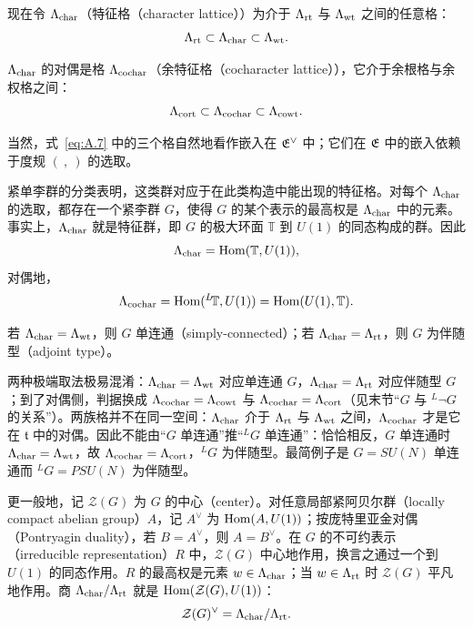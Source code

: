 现在令 $\Lambda_{\rm char}$（特征格（character lattice））为介于 $\Lambda_{\rm rt}$ 与 $\Lambda_{\rm wt}$ 之间的任意格：
\setcounter{equation}{5}
\begin{equation}\label{eq:A.6}
  \Lambda_{\rm rt}\subset \Lambda_{\rm char}\subset\Lambda_{\rm wt}.
\end{equation}

$\Lambda_{\rm char}$ 的对偶是格 $\Lambda_{\rm cochar}$（余特征格（cocharacter lattice）），它介于余根格与余权格之间：
\setcounter{equation}{6}
\begin{equation}\label{eq:A.7}
  \Lambda_{\rm cort}\subset \Lambda_{\rm cochar}\subset\Lambda_{\rm cowt}.
\end{equation}

当然，式~\eqref{eq:A.7} 中的三个格自然地看作嵌入在 $\mathfrak{E}^\vee$ 中；它们在 $\mathfrak{E}$ 中的嵌入依赖于度规 $(~,~)$ 的选取。

紧单李群的分类表明，这类群对应于在此类构造中能出现的特征格。对每个 $\Lambda_{\rm char}$ 的选取，都存在一个紧李群 $G$，使得 $G$ 的某个表示的最高权是 $\Lambda_{\rm char}$ 中的元素。事实上，$\Lambda_{\rm char}$ 就是特征群，即 $G$ 的极大环面 $\mathbb{T}$ 到 $U(1)$ 的同态构成的群。因此
\setcounter{equation}{7}
\begin{equation}\label{eq:A.8}
  \Lambda_{\rm char}={\rm Hom}(\mathbb{T},U(1)),
\end{equation}
对偶地，
\setcounter{equation}{8}
\begin{equation}\label{eq:A.9}
  \Lambda_{\rm cochar}={\rm Hom}({}^L\negthinspace{\mathbb{T}},U(1))={\rm Hom}(U(1),\mathbb{T}).
\end{equation}

若 $\Lambda_{\rm char}=\Lambda_{\rm wt}$，则 $G$ 单连通（simply-connected）；若 $\Lambda_{\rm char}=\Lambda_{\rm rt}$，则 $G$ 为伴随型（adjoint type）。

\begin{yizhu}[易错点]
两种极端取法极易混淆：$\Lambda_{\rm char}=\Lambda_{\rm wt}$ 对应单连通 $G$，$\Lambda_{\rm char}=\Lambda_{\rm rt}$ 对应伴随型 $G$；到了对偶侧，判据换成 $\Lambda_{\rm cochar}=\Lambda_{\rm cowt}$ 与 $\Lambda_{\rm cochar}=\Lambda_{\rm cort}$（见末节“$G$ 与 $^L\neg G$ 的关系”）。两族格并不在同一空间：$\Lambda_{\rm char}$ 介于 $\Lambda_{\rm rt}$ 与 $\Lambda_{\rm wt}$ 之间，$\Lambda_{\rm cochar}$ 才是它在 $\mathfrak t$ 中的对偶。因此不能由“$G$ 单连通”推“$^LG$ 单连通”：恰恰相反，$G$ 单连通时 $\Lambda_{\rm char}=\Lambda_{\rm wt}$，故 $\Lambda_{\rm cochar}=\Lambda_{\rm cort}$，$^LG$ 为伴随型。最简例子是 $G=SU(N)$ 单连通而 $^LG=PSU(N)$ 为伴随型。
\end{yizhu}

更一般地，记 ${\mathcal Z}(G)$ 为 $G$ 的中心（center）。对任意局部紧阿贝尔群（locally compact abelian group）$A$，记 $A^\vee$ 为 ${\rm Hom}(A,U(1))$；按庞特里亚金对偶（Pontryagin duality），若 $B=A^\vee$，则 $A=B^\vee$。在 $G$ 的不可约表示（irreducible representation）$R$ 中，${\mathcal Z}(G)$ 中心地作用，换言之通过一个到 $U(1)$ 的同态作用。$R$ 的最高权是元素 $w\in\Lambda_{\rm char}$；当 $w\in\Lambda_{\rm rt}$ 时 ${\mathcal Z}(G)$ 平凡地作用。商 $\Lambda_{\rm char}/\Lambda_{\rm rt}$ 就是 ${\rm Hom}({\mathcal Z}(G),U(1))$：
\setcounter{equation}{9}
\begin{equation}\label{eq:A.10}
  {\mathcal Z}(G)^\vee = \Lambda_{\rm char}/\Lambda_{\rm rt}.
\end{equation}


